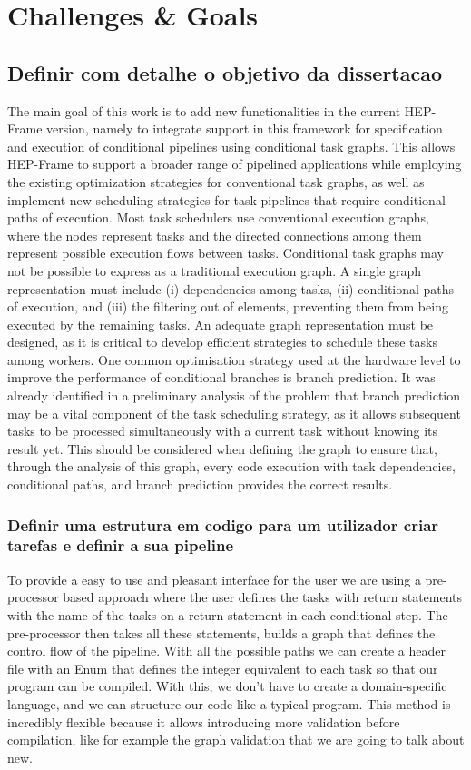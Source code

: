 
\section{Challenges \& Goals}


\subsection{ Definir com detalhe o objetivo da dissertacao}
The main goal of this work is to add new functionalities in the current HEP-Frame version, namely to integrate support in this framework for specification and execution of conditional pipelines using conditional task graphs. This allows HEP-Frame to support a broader range of pipelined applications while employing the existing optimization strategies for conventional task graphs, as well as implement new scheduling strategies for task pipelines that require conditional paths of execution.
Most task schedulers use conventional execution graphs, where the nodes represent tasks and the directed connections among them represent possible execution flows between tasks. Conditional task graphs may not be possible to express as a traditional execution graph. A single graph representation must include (i) dependencies among tasks, (ii) conditional paths of execution, and (iii) the filtering out of elements, preventing them from being executed by the remaining tasks. An adequate graph representation must be designed, as it is critical to develop efficient strategies to schedule these tasks among workers.
One common optimisation strategy used at the hardware level to improve the performance of conditional branches is branch prediction. It was already identified in a preliminary analysis of the problem that branch prediction may be a vital component of the task scheduling strategy, as it allows subsequent tasks to be processed simultaneously with a current task without knowing its result yet. This should be considered when defining the graph to ensure that, through the analysis of this graph, every code execution with task dependencies, conditional paths, and branch prediction provides the correct results.

\subsubsection{Definir uma estrutura em codigo para um utilizador criar tarefas e definir a sua pipeline}
To provide a easy to use and pleasant interface for the user we are using a pre-processor based approach where the user defines the tasks with return statements with the name of the tasks on a return statement in each conditional step. The pre-processor then takes all these statements, builds a graph that defines the control flow of the pipeline. With all the possible paths we can create a header file with an Enum that defines the integer equivalent to each task so that our program can be compiled. With this, we don't have to create a domain-specific language, and we can structure our code like a typical program. This method is incredibly flexible because it allows introducing more validation before compilation, like for example the graph validation that we are going to talk about new.

